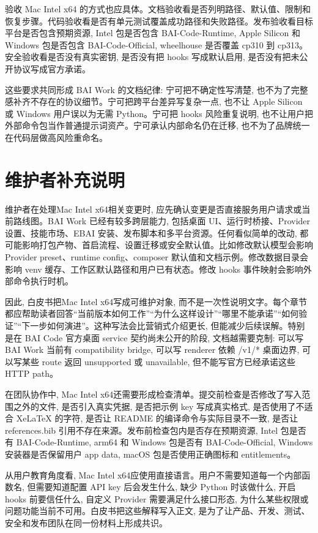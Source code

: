 验收 Mac Intel x64 的方式也应具体。文档验收看是否列明路径、默认值、限制和恢复步骤。代码验收看是否有单元测试覆盖成功路径和失败路径。发布验收看目标平台是否包含预期资源, Intel 包是否包含 BAI-Code-Runtime, Apple Silicon 和 Windows 包是否包含 BAI-Code-Official, wheelhouse 是否覆盖 cp310 到 cp313。安全验收看是否没有真实密钥, 是否没有把 hooks 写成默认启用, 是否没有把未公开协议写成官方承诺。

这些要求共同形成 BAI Work 的文档纪律: 宁可把不确定性写清楚, 也不为了完整感补齐不存在的协议细节。宁可把跨平台差异写复杂一点, 也不让 Apple Silicon 或 Windows 用户误以为无需 Python。宁可把 hooks 风险重复说明, 也不让用户把外部命令包当作普通提示词资产。宁可承认内部命名仍在迁移, 也不为了品牌统一在代码层做高风险重命名。

\section{维护者补充说明}

维护者在处理Mac Intel x64相关变更时, 应先确认变更是否直接服务用户请求或当前路线图。BAI Work 已经有较多跨层能力, 包括桌面 UI、运行时桥接、Provider 设置、技能市场、EBAI 安装、发布脚本和多平台资源。任何看似简单的改动, 都可能影响打包产物、首启流程、设置迁移或安全默认值。比如修改默认模型会影响 Provider preset、runtime config、composer 默认值和文档示例。修改数据目录会影响 venv 缓存、工作区默认路径和用户已有状态。修改 hooks 事件映射会影响外部命令执行时机。

因此, 白皮书把Mac Intel x64写成可维护对象, 而不是一次性说明文字。每个章节都应帮助读者回答“当前版本如何工作”“为什么这样设计”“哪里不能承诺”“如何验证”“下一步如何演进”。这种写法会比营销式介绍更长, 但能减少后续误解。特别是在 BAI Code 官方桌面 service 契约尚未公开的阶段, 文档越需要克制: 可以写 BAI Work 当前有 compatibility bridge, 可以写 renderer 依赖 /v1/* 桌面边界, 可以写某些 route 返回 unsupported 或 unavailable, 但不能写官方已经承诺这些 HTTP path。

在团队协作中, Mac Intel x64还需要形成检查清单。提交前检查是否修改了写入范围之外的文件, 是否引入真实凭据, 是否把示例 key 写成真实格式, 是否使用了不适合 XeLaTeX 的字符, 是否让 README 的编译命令与实际目录不一致, 是否让 references.bib 引用不存在来源。发布前检查包内是否存在预期资源, Intel 包是否有 BAI-Code-Runtime, arm64 和 Windows 包是否有 BAI-Code-Official, Windows 安装器是否保留用户 app data, macOS 包是否使用正确图标和 entitlements。

从用户教育角度看, Mac Intel x64应使用直接语言。用户不需要知道每一个内部函数名, 但需要知道配置 API key 后会发生什么, 缺少 Python 时该做什么, 开启 hooks 前要信任什么, 自定义 Provider 需要满足什么接口形态, 为什么某些权限或问题功能当前不可用。白皮书把这些解释写入正文, 是为了让产品、开发、测试、安全和发布团队在同一份材料上形成共识。

